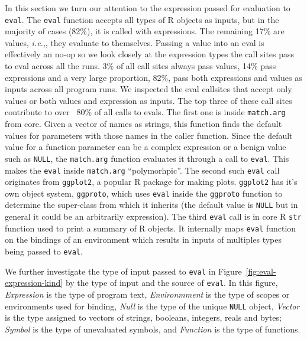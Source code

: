 \documentclass[a4paper,USenglish,cleveref, autoref, thm-restate]{lipics-v2019}
\newcommand{\AllValueInputEvalCallPerc}{17\%\xspace}
\newcommand{\AllExpressionInputEvalCallPerc}{82\%\xspace}
\newcommand{\AllExpressionInputEvalSitePerc}{14\%\xspace}
\newcommand{\AllValueInputEvalSitePerc}{3\%\xspace}
\newcommand{\AllPolymorphicInputEvalSitePerc}{82\%\xspace}
\newcommand{\ie}{\emph{i.e.},\xspace}
\newcommand{\eval}{\texttt{eval}\xspace}
\newcommand{\ggproto}{\c{ggproto}}
\newcommand{\ggplot}{\c{ggplot2}}
\renewcommand{\c}[1]{\lstinline{#1}\xspace}
\begin{document}
In this section we turn our attention to the expression passed for evaluation to
\eval. The \eval function accepts all types of R objects as inputs, but in the
majority of cases (\AllExpressionInputEvalCallPerc), it is called with
expressions. The remaining \AllValueInputEvalCallPerc are values, \ie, they
evaluate to themselves.
%
Passing a value into an eval is effectively an no-op so we look closely at the
expression types the call sites pass to eval across all the runs.
\AllValueInputEvalSitePerc of all call sites always pass values,
\AllExpressionInputEvalSitePerc pass expressions and a very large proportion,
\AllPolymorphicInputEvalSitePerc, pass both expressions and values as inputs
across all program runs. We inspected the eval callsites that accept only values
or both values and expression as inputs. The top three of these call sites
contribute to over ~80\% of all calls to evals. The first one is inside
\c{match.arg} from core. Given a vector of names as strings, this function finds
the default values for parameters with those names in the caller function. Since
the default value for a function parameter can be a complex expression or a
benign value such as \c{NULL}, the \c{match.arg} function evaluates it through a
call to \eval. This makes the \eval inside \c{match.arg} ``polymorhpic''. The
second such \eval call originates from \ggplot, a popular R package for making
plots. \ggplot has it's own object system, \ggproto, which uses \eval inside the
\ggproto function to determine the super-class from which it inherits (the
default value is \c{NULL} but in general it could be an arbitrarily expression).
The third \eval call is in core R \c{str} function used to print a summary of R
objects. It internally maps \eval function on the bindings of an environment
which results in inputs of multiples types being passed to \eval.

We further investigate the type of input passed to \eval in
Figure~\ref{fig:eval-expression-kind} by the type of input and the source of
\eval. In this figure, \emph{Expression} is the type of program text,
\emph{Environmment} is the type of scopes or environments used for binding,
\emph{Null} is the type of the unique \c{NULL} object, \emph{Vector} is the
type assigned to vectors of strings, booleans, integers, reals and bytes;
\emph{Symbol} is the type of unevaluated symbols, and \emph{Function} is the
type of functions.
\end{document}
